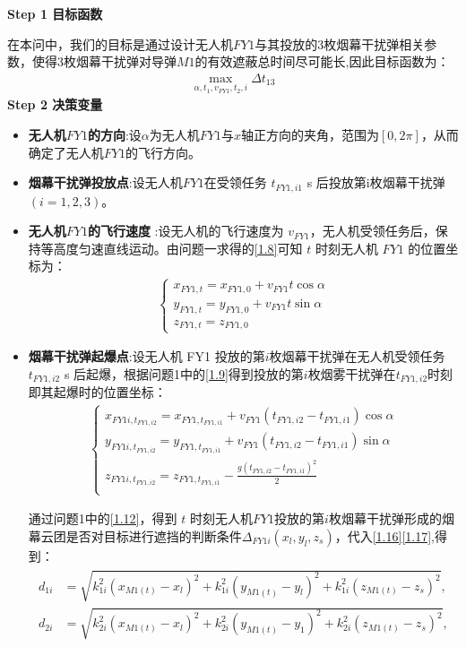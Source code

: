 \documentclass[../main.tex]{subfiles}
\begin{document}
\noindent \textbf{Step 1 目标函数}
\par 在本问中，我们的目标是通过设计无人机$FY1$与其投放的3枚烟幕干扰弹相关参数，使得3枚烟幕干扰弹对导弹$M1$的有效遮蔽总时间尽可能长,因此目标函数为：
\begin{align}\label{12.1}
  \underset{\alpha ,t_1,v_{FY1},t_2,i}{\max}\Delta t_{13}
\end{align}
\noindent \textbf{Step 2 决策变量}

\begin{itemize}
\item \textbf{无人机$FY1$的方向}:设$\alpha $为无人机$FY1$与$x$轴正方向的夹角，范围为$\left[ 0,2\pi \right] $，从而确定了无人机$FY1$的飞行方向。
\item \textbf{烟幕干扰弹投放点}:设无人机$FY1$在受领任务 \( t_{FY1,i1} \) s 后投放第i枚烟幕干扰弹$(i=1,2,3)$。
\item  \textbf{无人机$FY1$的飞行速度} :设无人机的飞行速度为 \( v_{FY1} \)，无人机受领任务后，保持等高度匀速直线运动。由问题一求得的\eqref{1.8}可知 \( t \) 时刻无人机 \( FY1 \) 的位置坐标为：
\begin{align}\label{12.3}
  \begin{cases}
x_{FY1,t} = x_{FY1,0} + v_{FY1} t \cos\alpha \\
y_{FY1,t} = y_{FY1,0} + v_{FY1} t \sin\alpha \\
z_{FY1,t} = z_{FY1,0}
\end{cases}
\end{align}
\item \textbf{烟幕干扰弹起爆点}:设无人机 FY1 投放的第$i$枚烟幕干扰弹在无人机受领任务 \( t_{FY1,i2} \) s 后起爆，根据问题1中的\eqref{1.9}得到投放的第$i$枚烟雾干扰弹在$t_{FY1,i2}$时刻即其起爆时的位置坐标：
\begin{align}\label{12.4}
\left\{ \begin{array}{l}
	x_{FY1i,t_{FY1,i2}}=x_{FY1,t_{FY1,i1}}+v_{FY1}\left( t_{FY1,i2}-t_{FY1,i1} \right) \cos \alpha\\
	y_{FY1i,t_{FY1,i2}}=y_{FY1,t_{FY1,i1}}+v_{FY1}\left( t_{FY1,i2}-t_{FY1,i1} \right) \sin \alpha\\
	z_{FY1i,t_{FY1,i2}}=z_{FY1,t_{FY1,i1}}-\frac{g\left( t_{FY1,i2}-t_{FY1,i1} \right) ^2}{2}\\
\end{array} \right. 
\end{align}

\par 通过问题1中的\eqref{1.12}，得到 $t$ 时刻无人机$FY1$投放的第$i$枚烟幕干扰弹形成的烟幕云团是否对目标进行遮挡的判断条件$\Delta _{FY1i}\left( x_l,y_l,z_s \right) $，代入\eqref{1.16}\eqref{1.17},得到：
\begin{align}\label{1.1712}
	\begin{aligned}
d_{1i} &= \sqrt{k_{1i}^2(x_{M1(t)} - x_l)^2 + k_{1i}^2(y_{M1(t)} - y_l)^2 + k_{1i}^2(z_{M1(t)} - z_s)^2}, \\
d_{2i} &= \sqrt{k_{2i}^2(x_{M1(t)} - x_l)^2 + k_{2i}^2(y_{M1(t)} - y_1)^2 + k_{2i}^2(z_{M1(t)} - z_s)^2},
\end{aligned}
\end{align}




\end{itemize}
\end{document}
